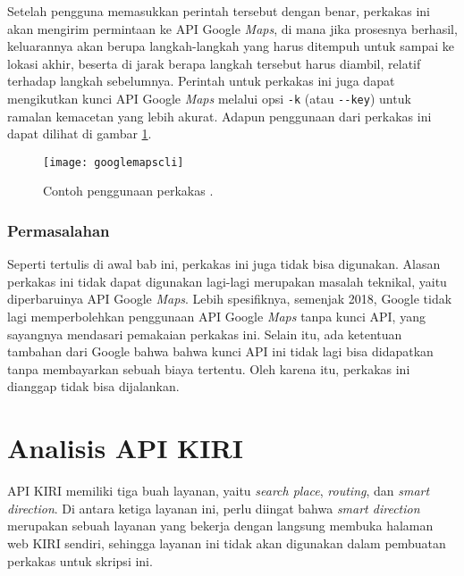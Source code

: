 Setelah pengguna memasukkan perintah tersebut dengan benar, perkakas ini akan mengirim permintaan ke API Google \textit{Maps}, di mana jika prosesnya berhasil, keluarannya akan berupa langkah-langkah yang harus ditempuh untuk sampai ke lokasi akhir, beserta di jarak berapa langkah tersebut harus diambil, relatif terhadap langkah sebelumnya. Perintah untuk perkakas ini juga dapat mengikutkan kunci API Google \textit{Maps} melalui opsi \texttt{-k} (atau \verb|--key|) untuk ramalan kemacetan yang lebih akurat. Adapun penggunaan dari perkakas ini dapat dilihat di gambar \ref{fig:similarapps-googlemapscli}.

\begin{figure}[ht]
    \centering
    \texttt{[image: googlemapscli]}
    \caption[Contoh penggunaan perkakas \googlemapscli]{Contoh penggunaan perkakas \googlemapscli.\protect\footnotemark}
    \label{fig:similarapps-googlemapscli}
\end{figure}

\subsubsection{Permasalahan}
\label{sec:similarapps-googlemapscli-problem}

Seperti tertulis di awal bab ini, perkakas ini juga tidak bisa digunakan. Alasan perkakas ini tidak dapat digunakan lagi-lagi merupakan masalah teknikal, yaitu diperbaruinya API Google \textit{Maps}. Lebih spesifiknya, semenjak 2018, Google tidak lagi memperbolehkan penggunaan API Google \textit{Maps} tanpa kunci API, yang sayangnya mendasari pemakaian perkakas ini. Selain itu, ada ketentuan tambahan dari Google bahwa bahwa kunci API ini tidak lagi bisa didapatkan tanpa membayarkan sebuah biaya tertentu. Oleh karena itu, perkakas ini dianggap tidak bisa dijalankan.

\section{Analisis API KIRI}
\label{sec:analysis-kiri}

API KIRI memiliki tiga buah layanan, yaitu \textit{search place}, \textit{routing}, dan \textit{smart direction}. Di antara ketiga layanan ini, perlu diingat bahwa \textit{smart direction} merupakan sebuah layanan yang bekerja dengan langsung membuka halaman web KIRI sendiri, sehingga layanan ini tidak akan digunakan dalam pembuatan perkakas \cl untuk skripsi ini.

